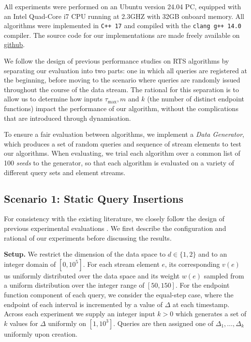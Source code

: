 All experiments were performed on an Ubuntu version 24.04 PC, equipped with an Intel Quad-Core i7 CPU running at 2.3GHZ with 32GB onboard memory. All algorithms were implemented in \texttt{C++ 17} and compiled with the \texttt{clang g++ 14.0} compiler. The source code for our implementations are made freely available on \href{https://github.com/Seannnnnnnnnnn/Dynamic-RTS/tree/master}{github}.

We follow the design of previous performance studies on RTS algorithms \cite{GAN16, DBLP:conf/sigmod/ZhangGBKCZ22} by separating our evaluation into two parts: one in which all queries are registered at the beginning, before moving to the scenario where queries are randomly issued throughout the course of the data stream. The rational for this separation is to allow us to determine how inputs $\tau_{\max}, m$ and $k$ (the number of distinct endpoint functions)  impact the performance of our algorithm, without the complications that are introduced through dynamisation. 

To ensure a fair evaluation between algorithms, we implement a \textit{Data Generator}, which produces a set of random queries and sequence of stream elements to test our algorithms. When evaluating, we trial each algorithm over a common list of 100 \textit{seeds} to the generator, so that each algorithm is evaluated on a variety of different query sets and element streams. 

\subsection{Scenario 1: Static Query Insertions}
\label{ssec:experiments-scenario-1}
For consistency with the existing literature, we closely follow the design of previous experimental evaluations \cite{GAN16, DBLP:conf/sigmod/ZhangGBKCZ22}. We first describe the configuration and rational of our experiments before discussing the results. 

\textbf{Setup.} We restrict the dimension of the data space to $d\in\{1,2\}$ and to an integer domain of $[0, 10^5]$. For each stream element $e$, its corresponding $v(e)$ us uniformly distributed over the data space and its weight $w(e)$ sampled from a uniform distribution over the integer range of $[50, 150]$. For the endpoint function component of each query, we consider the equal-step case, where the endpoint of each interval is incremented by a value of $\Delta$ at each timestamp. Across each experiment we supply an integer input $k>0$ which generates a set of $k$ values for $\Delta$ uniformly on $[1, 10^3]$. Queries are then assigned one of  $\Delta_1,\dots, \Delta_k$ uniformly upon creation. 

